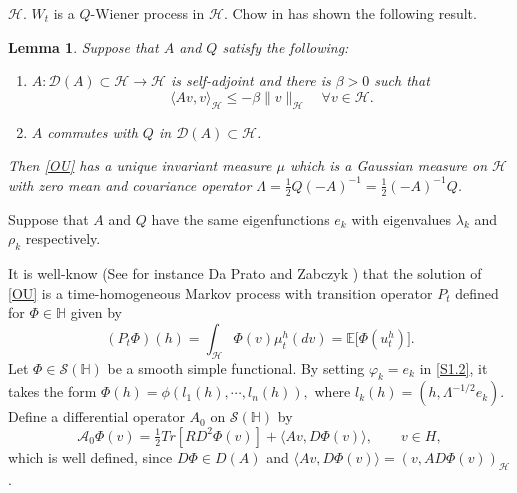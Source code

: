 \documentclass[]{interact}
\newcommand{\E}{\mathbb{E}}
\theoremstyle{plain}%
\newtheorem{lemma}[theorem]{Lemma}
\theoremstyle{definition}
\theoremstyle{remark}
\begin{document}
    $\mathcal{H}$. $W_t$ is a $Q$-Wiener process
    in $\mathcal{H}$. Chow in \cite[Lemma 9.4.1]{liu} has shown the following
    result.
    \begin{lemma} \label{lemma-AQ}
        Suppose that $A$ and $Q$ satisfy the following:
        \begin{enumerate}
            \item
                $A:\mathcal{D}(A)\subset \mathcal{H}\rightarrow \mathcal{H}$ is
                self-adjoint and there is $\beta>0$ such that
                \[
                    \langle Av,v\rangle_ \mathcal{H}\le -\beta\|v
                    \|_\mathcal{H}\quad
                    \forall v\in \mathcal{H}.
                \]
            \item $A$ commutes with $Q$ in $\mathcal{D}(A)\subset \mathcal{H}$.
        \end{enumerate}
        Then \eqref{OU} has a unique invariant measure $\mu$ which is a Gaussian
        measure on $ \mathcal{H}$ with zero mean and covariance
        operator
        $
            \Lambda=
                \tfrac{1}{2}Q(-A)^{-1}
                =\tfrac{1}{2}(-A)^{-1}Q
        $.
    \end{lemma}

        Suppose that $A$ and $Q$ have the same eigenfunctions $e_k$ with 
        eigenvalues $\lambda_k$ and $\rho_k$ respectively.

        It is well-know (See for instance Da Prato and Zabczyk \cite{da-za}) 
    that the solution of \eqref{OU} is a time-homogeneous Markov process with 
    transition operator $P_t$  defined for $\Phi\in\mathbb{H}$ given by
    \begin{equation}
        (P_t\Phi)(h)=
            \int_{\mathcal{H}}
                 \Phi(v) \mu_t ^ h(dv)
                 = \E
                 \big[
                    \Phi(u_t^h)
                 \big].
    \end{equation}
        Let $\Phi\in\mathcal{S}(\mathbb{H})$ be a smooth simple functional. By
    setting $\varphi_k = e_k$ in \eqref{S1.2}, it takes the form
    $
      \Phi(h) = \phi(l_1(h), \cdots, l_n (h)),
    $
    where $l_k(h) = (h, \Lambda^{-1/2} e_k )$. Define a differential operator
    $A_0$ on $\mathcal{S}(\mathbb{H})$ by
    \begin{equation}
    \label{def-A0}
      \mathcal{A}_0
        \Phi(v) = \tfrac{1}{2} Tr [RD^2 \Phi(v)] 
            + \langle Av, D\Phi(v)\rangle
            ,\qquad v \in H,
    \end{equation}
    which is well defined, since $D\Phi \in D(A)$ and
    $\langle Av, D\Phi(v)\rangle = (v, A D \Phi(v))_\mathcal{H}$.
\end{document}
